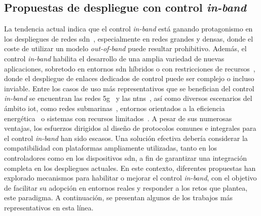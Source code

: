 \subsection{Propuestas de despliegue con control \textit{in-band}}
\label{subsec:propuestas_inband}

La tendencia actual indica que el control \textit{in-band} está ganando protagonismo en los despliegues de redes \gls{sdn}~\cite{Awan19}, especialmente en redes grandes y densas, donde el coste de utilizar un modelo \textit{out-of-band} puede resultar prohibitivo. Además, el control \textit{in-band} habilita el desarrollo de una amplia variedad de nuevas aplicaciones, sobretodo en entornos \gls{sdn} híbridos o con restricciones de recursos~\cite{Khorsandroo21,Rojas21}, donde el despliegue de enlaces dedicados de control puede ser complejo o incluso inviable. Entre los casos de uso más representativos que se benefician del control \textit{in-band} se encuentran las redes \gls{5g}~\cite{Murtadha21} y las \glspl{ntn}~\cite{Guo21}, así como diversos escenarios del ámbito \gls{iot}, como redes submarinas~\cite{Shi22}, entornos orientados a la eficiencia energética~\cite{Maity22} o sistemas con recursos limitados~\cite{Chattopadhyay19}. A pesar de sus numerosas ventajas, los esfuerzos dirigidos al diseño de protocolos comunes e integrales para el control \textit{in-band} han sido escasos. Una solución efectiva debería considerar la compatibilidad con plataformas ampliamente utilizadas, tanto en los controladores como en los dispositivos \gls{sdn}, a fin de garantizar una integración completa en los despliegues actuales. En este contexto, diferentes propuestas han explorado mecanismos para habilitar o mejorar el control \textit{in-band}, con el objetivo de facilitar su adopción en entornos reales y responder a los retos que plantea, este paradigma. A continuación, se presentan algunos de los trabajos más representativos en esta línea.\\
\\
